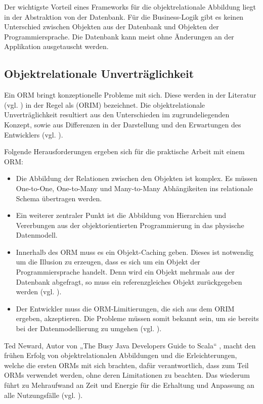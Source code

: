 Der wichtigste Vorteil eines Frameworks für die objektrelationale Abbildung liegt in der Abstraktion von der Datenbank. Für die Business-Logik gibt es keinen Unterschied zwischen Objekten aus der Datenbank und Objekten der Programmiersprache. Die Datenbank kann meist ohne Änderungen an der Applikation ausgetauscht werden.

\FloatBarrier
\subsection{Objektrelationale Unverträglichkeit}

Ein ORM bringt konzeptionelle Probleme mit sich. Diese werden in der Literatur (vgl. \cite{ireland2009classification}) in der Regel als  (ORIM) bezeichnet. Die objektrelationale Unverträglichkeit resultiert aus den Unterschieden im zugrundeliegenden Konzept, sowie aus Differenzen in der Darstellung und den Erwartungen des Entwicklers (vgl. \cite{bowers}).

Folgende Herausforderungen ergeben sich für die praktische Arbeit mit einem ORM:

\begin{itemize}
  \item Die Abbildung der Relationen zwischen den Objekten ist komplex. Es müssen One-to-One, One-to-Many und Many-to-Many Abhängikeiten ins relationale Schema übertragen werden.
\item Ein weiterer zentraler Punkt ist die Abbildung von Hierarchien und Vererbungen aus der objektorientierten Programmierung in das physische Datenmodell. 
\item Innerhalb des ORM muss es ein Objekt-Caching geben. Dieses ist notwendig um die Illusion zu erzeugen, dass es sich um ein Objekt der Programmiersprache handelt. Denn wird ein Objekt mehrmals aus der Datenbank abgefragt, so muss ein referenzgleiches Objekt zurückgegeben werden (vgl. \cite{inappropriate-abstractions}).
\item Der Entwickler muss die ORM-Limitierungen, die sich aus dem ORIM ergeben, akzeptieren. Die Probleme müssen somit bekannt sein, um sie bereits bei der Datenmodellierung zu umgehen (vgl. \cite{vietnam}). 
\end{itemize}

Ted Neward, Autor von „The Busy Java Developers Guide to Scala“ \cite{busy-to-scala}, macht den frühen Erfolg von objektrelationalen Abbildungen und die Erleichterungen, welche die ersten ORMs mit sich brachten, dafür verantwortlich, dass zum Teil ORMs verwendet werden, ohne deren Limitationen zu beachten. Das wiederum führt zu Mehraufwand an Zeit und Energie für die Erhaltung und Anpassung an alle Nutzungsfälle (vgl. \cite{vietnam}).

